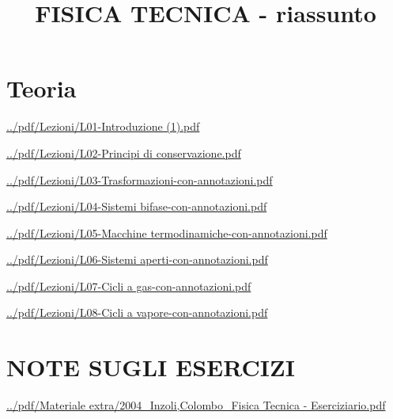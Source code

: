 \documentclass[a4paper, 9pt]{article}
\title{FISICA TECNICA - riassunto}
\begin{document}
    \maketitle
    \tableofcontents{}
    \newpage
    \part{Teoria}
    \newpage
    \url{../pdf/Lezioni/L01-Introduzione (1).pdf}
    
    \newpage
    \url{../pdf/Lezioni/L02-Principi di conservazione.pdf}
    
    \newpage
    \url{../pdf/Lezioni/L03-Trasformazioni-con-annotazioni.pdf}
    
    \newpage
    \url{../pdf/Lezioni/L04-Sistemi bifase-con-annotazioni.pdf}
    
    \newpage
    \url{../pdf/Lezioni/L05-Macchine termodinamiche-con-annotazioni.pdf}
    
    \newpage
    \url{../pdf/Lezioni/L06-Sistemi aperti-con-annotazioni.pdf}
    
    \newpage
    \url{../pdf/Lezioni/L07-Cicli a gas-con-annotazioni.pdf}
    
    \newpage
    \url{../pdf/Lezioni/L08-Cicli a vapore-con-annotazioni.pdf}
    
    \newpage
    \part{NOTE SUGLI ESERCIZI}
    \newpage
    \url{../pdf/Materiale extra/2004_Inzoli,Colombo_Fisica Tecnica - Eserciziario.pdf}
    
\end{document}
